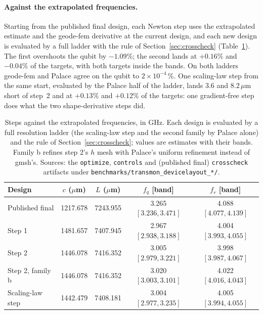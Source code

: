 \documentclass{anvil-paper}
\begin{document}
\paragraph{Against the extrapolated frequencies.}
Starting from the published final design, each Newton step uses the
extrapolated estimate and the geode-fem derivative at the current design,
and each new design is evaluated by a full ladder with the rule of
Section~\ref{sec:crosscheck} (Table~\ref{tab:newton-conv}).
The first overshoots the qubit by $-1.09\%$; the second lands at $+0.16\%$
and $-0.04\%$ of the targets, with both targets inside the bands. On both
ladders geode-fem and Palace agree on the qubit to $2\times10^{-4}\,\%$.
One scaling-law step from the same start, evaluated by the Palace half of
the ladder, lands $3.6$ and $8.2\,\mu$m short of step~2 and at $+0.13\%$
and $+0.12\%$ of the targets: one gradient-free step does what the two
shape-derivative steps did.

\begin{table}[htbp]
  \centering
  \caption{Steps against the extrapolated frequencies, in GHz. Each design
  is evaluated by a full resolution ladder (the scaling-law step and the
  second family by Palace alone) and the rule of
  Section~\ref{sec:crosscheck}; values are estimates with their bands.
  Family b refines step 2's $h$ mesh with Palace's uniform refinement
  instead of gmsh's. Sources: the \texttt{optimize}, \texttt{controls} and
  (published final) \texttt{crosscheck} artifacts under
  \texttt{benchmarks/transmon\_devicelayout\_*/}.}
  \label{tab:newton-conv}
  \footnotesize
  \begin{tabular}{@{}lcccc@{}}
    \toprule
    Design & $c$ ($\mu$m) & $L$ ($\mu$m) & $f_q$ [band] & $f_r$ [band] \\
    \midrule
    Published final & 1217.678 & 7243.955 & 3.265 $[3.236, 3.471]$ & 4.088 $[4.077, 4.139]$ \\
    Step 1 & 1481.657 & 7407.945 & 2.967 $[2.938, 3.188]$ & 4.004 $[3.993, 4.055]$ \\
    Step 2 & 1446.078 & 7416.352 & 3.005 $[2.979, 3.221]$ & 3.998 $[3.987, 4.067]$ \\
    Step 2, family b & 1446.078 & 7416.352 & 3.020 $[3.003, 3.101]$ & 4.022 $[4.016, 4.043]$ \\
    Scaling-law step & 1442.479 & 7408.181 & 3.004 $[2.977, 3.235]$ & 4.005 $[3.994, 4.055]$ \\
    \bottomrule
  \end{tabular}
\end{table}
\end{document}
